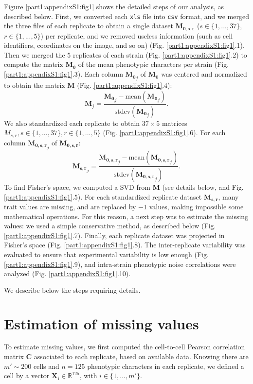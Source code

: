 Figure \ref{part1:appendixS1:fig1} shows the detailed steps of our analysis, as described  below. First, we converted each \texttt{xls} file into \texttt{csv} format, and we merged the three files of each replicate to obtain a single dataset $\boldsymbol{M_{0,s,r}}$ ($s \in \{1,...,37\}$, $r \in \{1,...,5\}$) per replicate, and we removed useless information (such as cell identifiers, coordinates on the image, and so on) (Fig. \ref{part1:appendixS1:fig1}.1).
Then we merged the 5 replicates of each strain (Fig. \ref{part1:appendixS1:fig1}.2) to compute the matrix $\boldsymbol{M_0}$ of the mean phenotypic characters per strain (Fig. \ref{part1:appendixS1:fig1}.3).
Each column ${\boldsymbol{M_0}}_j$ of $\boldsymbol{M_0}$ was centered and normalized to obtain the matrix $\boldsymbol{M}$ (Fig. \ref{part1:appendixS1:fig1}.4):
\begin{equation}
{\boldsymbol{M}}_j = \dfrac{{\boldsymbol{M_0}}_j-\mathrm{mean}({\boldsymbol{M_0}}_j)}{\mathrm{stdev}({\boldsymbol{M_0}}_j)}.
\end{equation}
We also standardized each replicate to obtain $37\times5$ matrices $M_{s,r}, s \in \{1,...,37\}, r \in \{1,...,5\}$ (Fig. \ref{part1:appendixS1:fig1}.6). For each column ${\boldsymbol{M_{0,s,r}}}_j$ of $\boldsymbol{M_{0,s,r}}$:
\begin{equation}
{\boldsymbol{M_{s,r}}}_j = \dfrac{{\boldsymbol{M_{0,s,r}}}_j-\mathrm{mean}({\boldsymbol{M_{0,s,r}}}_j)}{\mathrm{stdev}({\boldsymbol{M_{0,s,r}}}_j)}.
\end{equation}
To find Fisher's space, we computed a SVD from $\boldsymbol{M}$ (see details below, and Fig. \ref{part1:appendixS1:fig1}.5).
For each standardized replicate dataset $\boldsymbol{M_{s,r}}$, many trait values are missing, and are replaced by $-1$ values, making impossible some mathematical operations. For this reason, a next step was to estimate the missing values: we used a simple conservative method, as described below (Fig. \ref{part1:appendixS1:fig1}.7). Finally, each replicate dataset was projected in Fisher's space (Fig. \ref{part1:appendixS1:fig1}.8). The inter-replicate variability was evaluated to ensure that experimental variability is low enough (Fig. \ref{part1:appendixS1:fig1}.9), and intra-strain phenotypic noise correlations were analyzed (Fig. \ref{part1:appendixS1:fig1}.10).

We describe below the steps requiring details.


\section*{Estimation of missing values}
To estimate missing values, we first computed the cell-to-cell Pearson correlation matrix $\boldsymbol{C}$ associated to each replicate, based on available data.
Knowing there are $m' \sim 200$ cells and $n=125$ phenotypic characters in each replicate, we defined a cell by a vector $\boldsymbol{X_i} \in \mathbb{R}^{125}$, with $i \in \{1,...,m'\}$.

